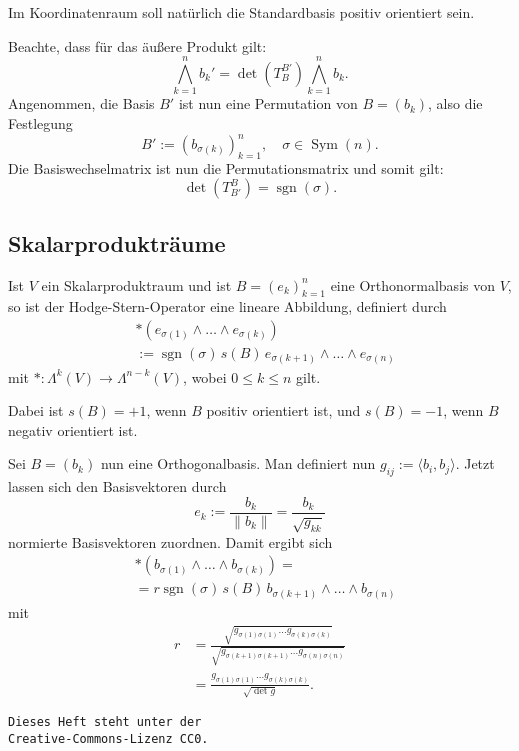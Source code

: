 \documentclass[a4paper,10pt,fleqn,twocolumn,twoside]{scrartcl}
\numberwithin{equation}{section}
\newcommand{\sgn}{\operatorname{sgn}}
\begin{document}
Im Koordinatenraum soll natürlich die Standardbasis positiv
orientiert sein.

Beachte, dass für das äußere Produkt gilt:
\begin{equation}
\bigwedge_{k=1}^n b_k' = \det(T_B^{B'}) \bigwedge_{k=1}^n b_k.
\end{equation}
Angenommen, die Basis $B'$ ist nun eine Permutation von $B=(b_k)$,
also die Festlegung
\begin{equation}
B' := (b_{\sigma(k)})_{k=1}^n, \quad \sigma\in\operatorname{Sym}(n).
\end{equation}
Die Basiswechselmatrix ist nun die Permutationsmatrix und somit gilt:
\begin{equation}
\det(T_{B'}^B) = \sgn(\sigma).
\end{equation}

\subsection{Skalarprodukträume}
Ist $V$ ein Skalarproduktraum und ist
$B=(e_k)_{k=1}^n$ eine Orthonormalbasis von $V$,
so ist der Hodge-Stern-Operator eine lineare Abbildung,
definiert durch%
\begin{equation}
\begin{split}
&*(e_{\sigma(1)}\wedge\ldots\wedge e_{\sigma(k)})\\
&:= \sgn(\sigma)\,s(B)\,e_{\sigma(k+1)}\wedge\ldots\wedge e_{\sigma(n)}
\end{split}
\end{equation}
mit $*\colon \Lambda^k(V)\to\Lambda^{n-k}(V)$,
wobei $0\le k\le n$ gilt.

Dabei ist $s(B)=+1$, wenn $B$ positiv orientiert ist,
und $s(B)=-1$, wenn $B$ negativ orientiert ist.

Sei $B=(b_k)$ nun eine Orthogonalbasis. Man definiert nun
$g_{ij}:=\langle b_i,b_j\rangle$. Jetzt lassen sich den
Basisvektoren durch
\begin{equation}
e_k := \frac{b_k}{\|b_k\|} = \frac{b_k}{\sqrt{g_{kk}}}
\end{equation}
normierte Basisvektoren zuordnen. Damit ergibt sich
\begin{equation}
\begin{split}
&*(b_{\sigma(1)}\wedge\ldots\wedge b_{\sigma(k)}) =\\
&= r \sgn(\sigma)\,s(B)\,b_{\sigma(k+1)}\wedge\ldots\wedge b_{\sigma(n)}
\end{split}
\end{equation}
mit
\begin{equation}
\begin{split}
r &= \frac{\sqrt{g_{\sigma(1)\sigma(1)}\ldots g_{\sigma(k)\sigma(k)}}}
{\sqrt{g_{\sigma(k+1)\sigma(k+1)}\ldots g_{\sigma(n)\sigma(n)}}}\\
&=\frac{g_{\sigma(1)\sigma(1)}\ldots g_{\sigma(k)\sigma(k)}}{\sqrt{\det g}}.
\end{split}
\end{equation}

\vfill\noindent
\texttt{Dieses Heft steht unter der\\
Creative-Commons-Lizenz CC0.}
\end{document}
